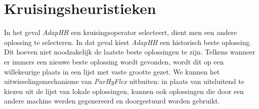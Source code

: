 \section{Kruisingsheuristieken}

In het geval \emph{AdapHH} een kruisingsoperator selecteert, dient men een andere oplossing te selecteren. In dat geval kiest \emph{AdapHH} een historisch beste oplossing. Dit hoeven niet noodzakelijk de laatste beste oplossingen te zijn. Telkens wanneer er immers een nieuwe beste oplossing wordt gevonden, wordt dit op een willekeurige plaats in een lijst met vaste grootte gezet. We kunnen het uitwisselingsmechanisme van \emph{ParHyFlex} uitbuiten: in plaats van uitsluitend te kiezen uit de lijst van lokale oplossingen, kunnen ook oplossingen die door een andere machine werden gegenereerd en doorgestuurd worden gebruikt.